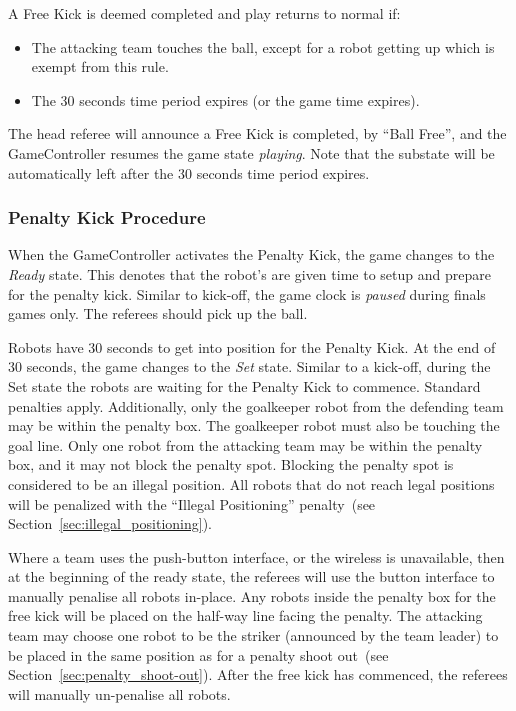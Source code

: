 \documentclass[12pt]{article}
\newcommand{\cf}{see\xspace}
\newcommand{\FreeKickTime}{30 seconds\xspace}
\newcommand{\PenaltyFreeKickSetupTime}{30 seconds\xspace}
\begin{document}
A Free Kick is deemed completed and play returns to normal if:
\begin{itemize}
    \item The attacking team touches the ball, except for a robot getting up which is exempt from this rule.
    \item The \FreeKickTime time period expires (or the game time expires).
\end{itemize}
The head referee will announce a Free Kick is completed, by ``Ball Free'', and the GameController
resumes the game state \emph{playing}. Note that the substate will be automatically left after the \FreeKickTime time period expires.

\subsubsection{Penalty Kick Procedure}
\label{sec:penalty_free_kick}

When the GameController activates the Penalty Kick, the game changes to the \textit{Ready} state.
This denotes that the robot's are given time to setup and prepare for the penalty kick.
Similar to kick-off, the game clock is \textit{paused} during finals games only.
The referees should pick up the ball.

Robots have \PenaltyFreeKickSetupTime to get into position for the Penalty Kick. At the end of 30 seconds, the game changes to the \textit{Set} state.
Similar to a kick-off, during the Set state the robots are waiting for the Penalty Kick to commence.
Standard penalties apply.
Additionally, only the goalkeeper robot from the defending team may be within the penalty box. The goalkeeper robot must also be touching the goal line.
Only one robot from the attacking team may be within the penalty box, and it may not block the penalty spot.
Blocking the penalty spot is considered to be an illegal position.
All robots that do not reach legal positions will be penalized with the ``Illegal Positioning'' penalty~(\cf Section~\ref{sec:illegal_positioning}).

Where a team uses the push-button interface, or the wireless is unavailable, then at the beginning of the ready state, the referees will use the button interface to manually penalise all robots in-place.
Any robots inside the penalty box for the free kick will be placed on the half-way line facing the penalty.
The attacking team may choose one robot to be the striker (announced by the team leader) to be placed in the same position as for a penalty shoot out~(\cf Section~\ref{sec:penalty_shoot-out}).
After the free kick has commenced, the referees will manually un-penalise all robots.
\end{document}
